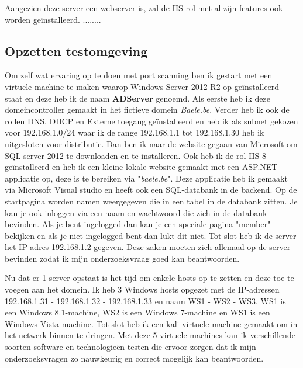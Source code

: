 \documentclass[pdftex,a4paper,12pt]{report}
\begin{document}
Aangezien deze server een webserver is, zal de IIS-rol met al zijn features ook worden geïnstalleerd. ........



\subsection{Opzetten testomgeving}
Om zelf wat ervaring op te doen met port scanning ben ik gestart met een virtuele machine te maken waarop Windows Server 2012 R2 op geïnstalleerd staat en deze heb ik de naam \textbf{ADServer} genoemd. Als eerste heb ik deze domeincontroller gemaakt in het fictieve domein \textit{Baele.be}. Verder heb ik ook de rollen DNS, DHCP en Externe toegang geïnstalleerd en heb ik als subnet gekozen voor 192.168.1.0/24 waar ik de range 192.168.1.1 tot 192.168.1.30 heb ik uitgesloten voor distributie. Dan ben ik naar de website gegaan van Microsoft om SQL server 2012 te downloaden en te installeren. Ook heb ik de rol IIS 8 geïnstalleerd en heb ik een kleine lokale website gemaakt met een ASP.NET-applicatie op, deze is te bereiken via "\textit{baele.be}". Deze applicatie heb ik gemaakt via Microsoft Visual studio en heeft ook een SQL-databank in de backend. Op de startpagina worden namen weergegeven die in een tabel in de databank zitten. Je kan je ook inloggen via een naam en wachtwoord die zich in de databank bevinden. Als je bent ingelogged dan kan je een speciale pagina "member" bekijken en als je niet ingelogged bent dan lukt dit niet. Tot slot heb ik de server het IP-adres 192.168.1.2 gegeven. Deze zaken moeten zich allemaal op de server bevinden zodat ik mijn onderzoeksvraag goed kan beantwoorden. \newline

Nu dat er 1 server opstaat is het tijd om enkele hosts op te zetten en deze toe te voegen aan het domein. Ik heb 3 Windows hosts opgezet met de IP-adressen 192.168.1.31 - 192.168.1.32 - 192.168.1.33 en naam WS1 - WS2 - WS3. WS1 is een Windows 8.1-machine, WS2 is een Windows 7-machine en WS1 is een Windows Vista-machine. Tot slot heb ik een kali virtuele machine gemaakt om in het netwerk binnen te dringen. Met deze 5 virtuele machines kan ik verschillende soorten software en technologieën testen die ervoor zorgen dat ik mijn onderzoeksvragen zo nauwkeurig en correct mogelijk kan beantwoorden. 

\subsection{}
\end{document}
